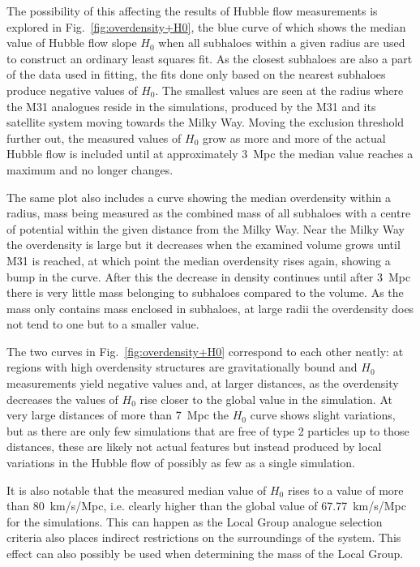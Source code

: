 \documentclass[english, twoside]{HYgradu}
\begin{document}
The possibility of this affecting the results of Hubble flow measurements is explored in Fig.~\ref{fig:overdensity+H0}, the blue curve of which shows the median value of Hubble flow slope $H_0$ when all subhaloes within a given radius are used to construct an ordinary least squares fit. As the closest subhaloes are also a part of the data used in fitting, the fits done only based on the nearest subhaloes produce negative values of $H_0$. The smallest values are seen at the radius where the M31 analogues reside in the simulations, produced by the M31 and its satellite system moving towards the Milky Way. Moving the exclusion threshold further out, the measured values of $H_0$ grow as more and more of the actual Hubble flow is included until at approximately 3~Mpc the median value reaches a maximum and no longer changes.

The same plot also includes a curve showing the median overdensity within a radius, mass being measured as the combined mass of all subhaloes with a centre of potential within the given distance from the Milky Way. Near the Milky Way the overdensity is large but it decreases when the examined volume grows until M31 is reached, at which point the median overdensity rises again, showing a bump in the curve. After this the decrease in density continues until after 3~Mpc there is very little mass belonging to subhaloes compared to the  volume. As the mass only contains mass enclosed in subhaloes, at large radii the overdensity does not tend to one but to a smaller value.

The two curves in Fig.~\ref{fig:overdensity+H0} correspond to each other neatly: at regions with high overdensity structures are gravitationally bound and $H_0$ measurements yield negative values and, at larger distances, as the overdensity decreases the values of $H_0$ rise closer to the global value in the simulation. At very large distances of more than 7~Mpc the $H_0$ curve shows slight variations, but as there are only few simulations that are free of type 2 particles up to those distances, these are likely not actual features but instead produced by local variations in the Hubble flow of possibly as few as a single simulation.

It is also notable that the measured median value of $H_0$ rises to a value of more than 80~km/s/Mpc, i.e. clearly higher than the global value of 67.77~km/s/Mpc for the simulations. This can happen as the Local Group analogue selection criteria also places indirect restrictions on the surroundings of the system. This effect can also possibly be used when determining the mass of the Local Group.
\end{document}
